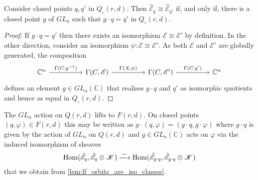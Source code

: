 \documentclass[12pt]{ociamthesis}  %
\begin{document}
\begin{lemma}\label{lem:lf_orbits_are_iso_classes}
  Consider closed points $q,q'$ in $Q_\circ(r,d)$.
  Then $\hat{\mathscr E}_q\cong\hat{\mathscr E}_{q'}$
  if, and only if, there is a closed point $g$ of $GL_n$
  such that $g\cdot q = q'$ in $Q_\circ(r,d)$.
  \begin{proof}
    If $g\cdot q = q'$ then there exists an isomorphism
    $\mathscr E\cong\mathscr E'$ by definition. In the other direction,
    consider an isomorphism $\psi:\mathscr E\cong\mathscr E'$.
    As both $\mathscr E$ and $\mathscr E'$ are globally generated,
    the composition
    \begin{equation*}
      \begin{tikzcd}
        {\mathbb C^n} && {\Gamma(C,\mathscr E)} && {\Gamma(C,\mathscr E')} && {\mathbb C^n}
        \arrow["{\Gamma(C,q^{-1})}", from=1-1, to=1-3]
        \arrow["{\Gamma(X,\psi)}", from=1-3, to=1-5]
        \arrow["{\Gamma(C,q')}", from=1-5, to=1-7]
      \end{tikzcd}
    \end{equation*}
    defines an element $g\in GL_n(\mathbb C)$ that realises
    $g\cdot q$ and $q'$ as isomorphic quotients and hence as
    equal in $Q_\circ(r,d)$.
  \end{proof}
\end{lemma}

\begin{example}
  The $GL_n$ action on $Q(r,d)$ lifts to $F(r,d)$. \cite[281-282]{nitsure1991}
  On closed points $(q,\varphi)\in F(r,d)$ this may be written
  as $g\cdot(q,\varphi) = (g\cdot q, g\cdot\varphi)$ where
  $g\cdot q$ is given by the action of $GL_n$ on $Q(r,d)$ and
  $g\in GL_n(\mathbb C)$ acts on $\varphi$ via the induced isomorphism
  of sheaves
  \begin{align*}
    \Hom(\hat{\mathscr E}_q,\hat{\mathscr E}_q\otimes\mathscr K)
    \xlongrightarrow{\sim}
    \Hom(\hat{\mathscr E}_{g\cdot q},\hat{\mathscr E}_{g\cdot q}\otimes\mathscr K)
  \end{align*}
  that we obtain from \ref{lem:lf_orbits_are_iso_classes}.
\end{example}
\end{document}
